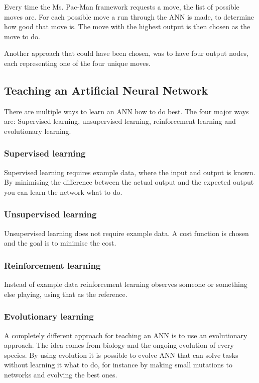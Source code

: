 Every time the Ms. Pac-Man framework requests a move, the list of possible moves are. For each possible move a run through the ANN is made, to determine how good that move is. The move with the highest output is then chosen as the move to do.

Another approach that could have been chosen, was to have four output nodes, each representing one of the four unique moves.



\subsection{Teaching an Artificial Neural Network}
There are multiple ways to learn an ANN how to do best. The four major ways are: Supervised learning, unsupervised learning, reinforcement learning and evolutionary learning.

\subsubsection{Supervised learning}
Supervised learning requires example data, where the input and output is known. By minimising the difference between the actual output and the expected output you can learn the network what to do.

\subsubsection{Unsupervised learning}
Unsupervised learning does not require example data. A cost function is chosen and the goal is to minimise the cost.

\subsubsection{Reinforcement learning}
Instead of example data reinforcement learning observes someone or something else playing, using that as the reference.

\subsubsection{Evolutionary learning}
A completely different approach for teaching an ANN is to use an evolutionary approach. The idea comes from biology and the ongoing evolution of every species. By using evolution it is possible to evolve ANN that can solve tasks without learning it what to do, for instance by making small mutations to networks and evolving the best ones.

